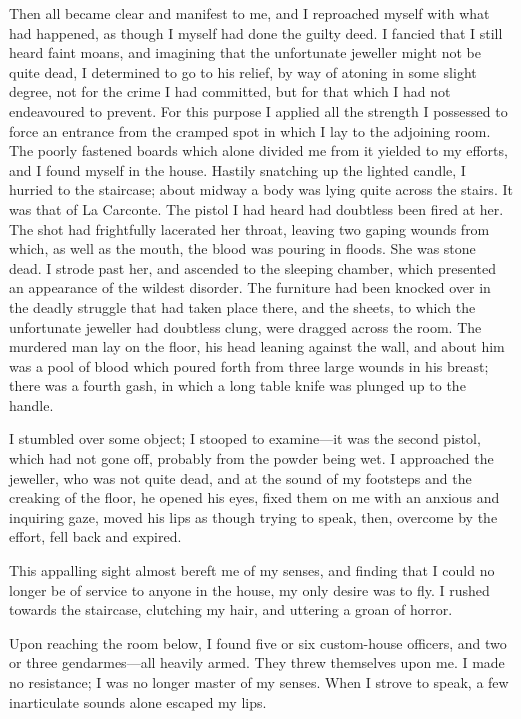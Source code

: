  Then all became clear and manifest to me, and I reproached myself with what had happened, as though I myself had done the guilty deed. I fancied that I still heard faint moans, and imagining that the unfortunate jeweller might not be quite dead, I determined to go to his relief, by way of atoning in some slight degree, not for the crime I had committed, but for that which I had not endeavoured to prevent. For this purpose I applied all the strength I possessed to force an entrance from the cramped spot in which I lay to the adjoining room. The poorly fastened boards which alone divided me from it yielded to my efforts, and I found myself in the house. Hastily snatching up the lighted candle, I hurried to the staircase; about midway a body was lying quite across the stairs. It was that of La Carconte. The pistol I had heard had doubtless been fired at her. The shot had frightfully lacerated her throat, leaving two gaping wounds from which, as well as the mouth, the blood was pouring in floods. She was stone dead. I strode past her, and ascended to the sleeping chamber, which presented an appearance of the wildest disorder. The furniture had been knocked over in the deadly struggle that had taken place there, and the sheets, to which the unfortunate jeweller had doubtless clung, were dragged across the room. The murdered man lay on the floor, his head leaning against the wall, and about him was a pool of blood which poured forth from three large wounds in his breast; there was a fourth gash, in which a long table knife was plunged up to the handle. 

I stumbled over some object; I stooped to examine—it was the second pistol, which had not gone off, probably from the powder being wet. I approached the jeweller, who was not quite dead, and at the sound of my footsteps and the creaking of the floor, he opened his eyes, fixed them on me with an anxious and inquiring gaze, moved his lips as though trying to speak, then, overcome by the effort, fell back and expired. 

This appalling sight almost bereft me of my senses, and finding that I could no longer be of service to anyone in the house, my only desire was to fly. I rushed towards the staircase, clutching my hair, and uttering a groan of horror. 

Upon reaching the room below, I found five or six custom-house officers, and two or three gendarmes—all heavily armed. They threw themselves upon me. I made no resistance; I was no longer master of my senses. When I strove to speak, a few inarticulate sounds alone escaped my lips. 

